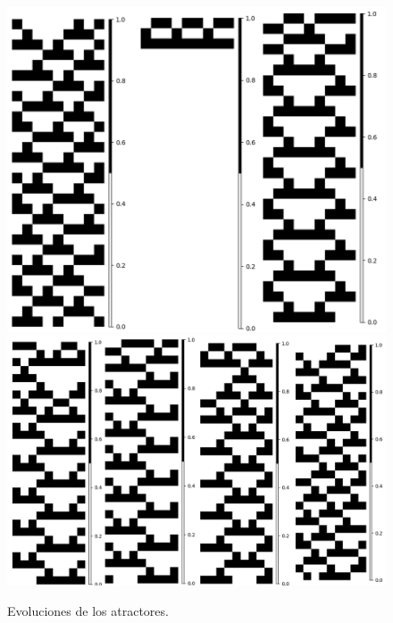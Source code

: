 \documentclass[11pt]{article}
\begin{document}
			\begin{figure}[H]
			\centering
			\includegraphics[scale=0.3]{resources/Atractores54/atractor_54_size_9_res.png}
			\includegraphics[scale=0.3]{resources/Atractores54/atractor_54_size_9_res1.png}
			\caption{Evoluciones de los atractores.}\label{fig:picture}
			\end{figure}
\end{document}
